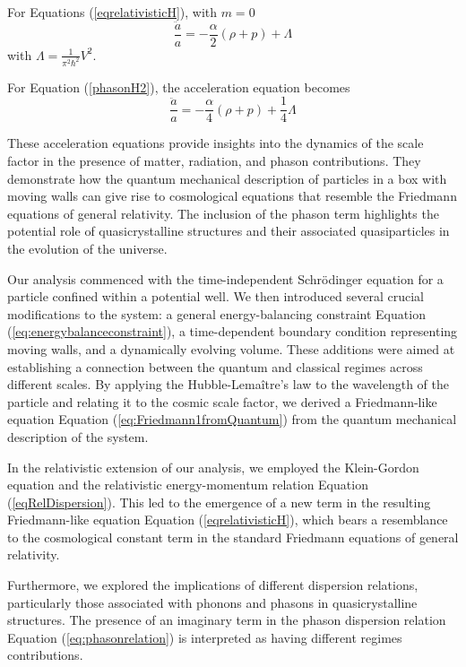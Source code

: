 \documentclass[sn-mathphys-num]{sn-jnl}%
\begin{document}
For Equations (\ref{eqrelativisticH}), with $m=0$
\begin{equation}
\frac{\ddot{a}}{a}=-\frac{\alpha}{2}(\rho+p)+\Lambda \label{freedmanrela1}
\end{equation}
with $\Lambda=\frac{1}{\pi^{2}\hbar^{2}}V^{2}$.

For Equation (\ref{phasonH2}), the acceleration equation becomes
\begin{equation}
\frac{\ddot{a}}{a}=-\frac{\alpha}{4}(\rho+p)+\frac{1}{4}\Lambda \label{freedmanrela2}
\end{equation}

These acceleration equations provide insights into the dynamics of the scale factor in the presence of matter, radiation, and phason contributions. They demonstrate how the quantum mechanical description of particles in a box with moving walls can give rise to cosmological equations that resemble the Friedmann equations of general relativity. The inclusion of the phason term highlights the potential role of quasicrystalline structures and their associated quasiparticles in the evolution of the universe.


Our analysis commenced with the time-independent Schr{\"o}dinger equation for a particle confined within a potential well. We then introduced several crucial modifications to the system: a general energy-balancing constraint Equation (\ref{eq:energybalanceconstraint}), a time-dependent boundary condition representing moving walls, and a dynamically evolving volume. These additions were aimed at establishing a connection between the quantum and classical regimes across different scales. By applying the Hubble-Lemaître's law to the wavelength of the particle and relating it to the cosmic scale factor, we derived a Friedmann-like equation Equation (\ref{eq:Friedmann1fromQuantum}) from the quantum mechanical description of the system.

In the relativistic extension of our analysis, we employed the Klein-Gordon equation and the relativistic energy-momentum relation Equation (\ref{eqRelDispersion}). This led to the emergence of a new term in the resulting Friedmann-like equation Equation (\ref{eqrelativisticH}), which bears a resemblance to the cosmological constant term in the standard Friedmann equations of general relativity.

Furthermore, we explored the implications of different dispersion relations, particularly those associated with phonons and phasons in quasicrystalline structures. The presence of an imaginary term in the phason dispersion relation Equation (\ref{eq:phasonrelation}) is interpreted as having different regimes contributions. 
\end{document}
